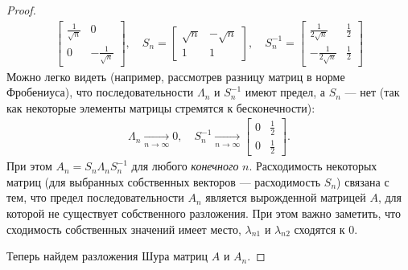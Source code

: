 \documentclass{article}
\newtheorem*{proof}{$\square$}
\begin{document}
\begin{proof}
\begin{equation*}
\begin{aligned}
\begin{bmatrix}
					\frac{1}{\sqrt{n}} & 0 \\ 0 & -\frac{1}{\sqrt{n}}
				\end{bmatrix},\quad
				S_n = \begin{bmatrix}
					\sqrt{n} & -\sqrt{n}\\1 & 1
				\end{bmatrix},\quad 
				S_n^{-1} = \begin{bmatrix}
				\frac{1}{2\sqrt{n}} & \frac{1}{2}\\ -\frac{1}{2\sqrt{n}} & \frac{1}{2}
				\end{bmatrix}
			\end{aligned}\end{equation*}
			Можно легко видеть (например, рассмотрев разницу матриц в норме Фробениуса), что последовательности $\Lambda_n$ и $S_n^{-1}$ имеют предел, а $S_n$ --- нет (так как некоторые элементы матрицы стремятся к бесконечности):
			\begin{equation*}\begin{aligned}
			\Lambda_n\xrightarrow[n\to\infty]{} 0,\quad
			 S_n^{-1} \xrightarrow[n\to\infty]{}
			 \begin{bmatrix}
			 	0 & \frac{1}{2}\\ 0 & \frac{1}{2}
			 \end{bmatrix}.
			\end{aligned}\end{equation*}
			При этом $A_n = S_n \Lambda_n S_n^{-1}$ для любого \textit{конечного} $n$. Расходимость некоторых матриц (для выбранных собственных векторов --- расходимость $S_n$) связана с тем, что предел последовательности $A_n$ является вырожденной матрицей $A$, для которой не существует собственного разложения. При этом важно заметить, что сходимость собственных значений имеет место, $\lambda_{n1}$ и $\lambda_{n2}$ сходятся к 0.
			
			Теперь найдем разложения Шура матриц $A$ и $A_n$. 
			

\end{proof}
\end{document}

